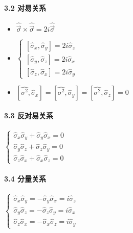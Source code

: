 \documentclass[UTF8,twocolumn]{ctexart}
\providecommand{\tightlist}{%
  \setlength{\itemsep}{0pt}\setlength{\parskip}{0pt}}
\let\oldparagraph\paragraph
\renewcommand{\paragraph}[1]{\oldparagraph{#1}\mbox{}}
\begin{document}
\hypertarget{ux5bf9ux6613ux5173ux7cfb-1}{%
\paragraph{ 3.2 对易关系}\label{ux5bf9ux6613ux5173ux7cfb-1}}

\begin{itemize}
\tightlist
\item
  \(\hat{\vec{\sigma}}\times\hat{\vec{\sigma}}=2i\hat{\vec{\sigma}}\)
\item
  \(\begin{cases}
        [\hat{\sigma}_x,\hat{\sigma}_y]=2i\hat{\sigma}_z \\
        [\hat{\sigma}_y,\hat{\sigma}_z]=2i\hat{\sigma}_x \\
        [\hat{\sigma}_z,\hat{\sigma}_x]=2i\hat{\sigma}_y 
  \end{cases}\)
\item
  \([\hat{\sigma^2},\hat{\sigma}_x]=[\hat{\sigma^2},\hat{\sigma}_y]=[\hat{\sigma^2},\hat{\sigma}_z]=0\)
\end{itemize}

\hypertarget{ux53cdux5bf9ux6613ux5173ux7cfb}{%
\paragraph{ 3.3 反对易关系}\label{ux53cdux5bf9ux6613ux5173ux7cfb}}

\begin{center}
$\begin{cases}
        \hat{\sigma}_x\hat{\sigma}_y+\hat{\sigma}_y\hat{\sigma}_x=0 \\
        \hat{\sigma}_y\hat{\sigma}_z+\hat{\sigma}_z\hat{\sigma}_y=0 \\
        \hat{\sigma}_z\hat{\sigma}_x+\hat{\sigma}_x\hat{\sigma}_z=0
\end{cases}$
\end{center}

\hypertarget{ux5206ux91cfux5173ux7cfb}{%
\paragraph{ 3.4 分量关系}\label{ux5206ux91cfux5173ux7cfb}}

\begin{center}
$\begin{cases}
        \hat{\sigma}_x\hat{\sigma}_y=-\hat{\sigma}_y\hat{\sigma}_x=i\hat{\sigma}_z \\
        \hat{\sigma}_y\hat{\sigma}_z=-\hat{\sigma}_z\hat{\sigma}_y=i\hat{\sigma}_x \\
        \hat{\sigma}_z\hat{\sigma}_x=-\hat{\sigma}_x\hat{\sigma}_z=i\hat{\sigma}_y
\end{cases}$
\end{center}
\end{document}
